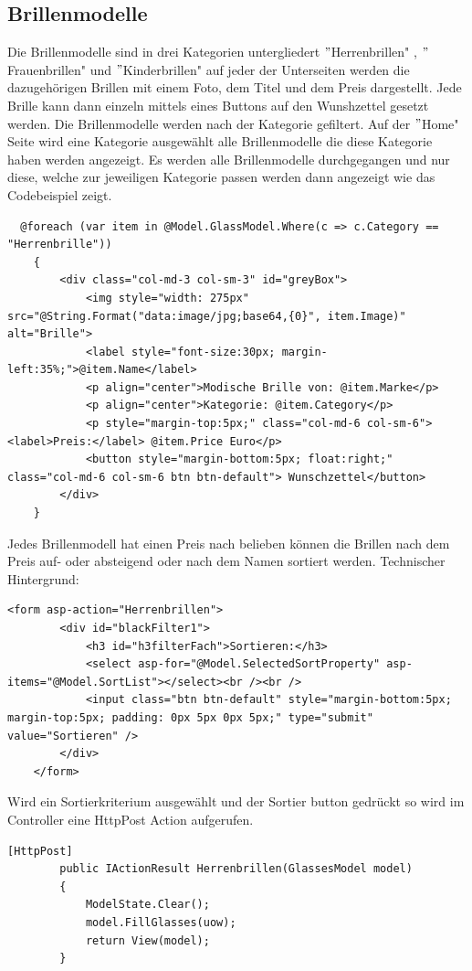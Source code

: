 \subsection{Brillenmodelle}
Die Brillenmodelle sind in drei Kategorien untergliedert $"$Herrenbrillen" , $"$Frauenbrillen" und $"$Kinderbrillen" auf jeder der Unterseiten werden die dazugehörigen Brillen mit einem Foto, dem Titel und dem Preis dargestellt. Jede Brille kann dann einzeln mittels eines Buttons auf den Wunshzettel gesetzt werden.
Die Brillenmodelle werden nach der Kategorie gefiltert. Auf der $"$Home" Seite wird eine Kategorie ausgewählt alle Brillenmodelle die diese Kategorie haben werden angezeigt.
Es werden alle Brillenmodelle durchgegangen und nur diese, welche zur jeweiligen Kategorie passen werden dann angezeigt wie das Codebeispiel zeigt.
\begin{lstlisting}
  @foreach (var item in @Model.GlassModel.Where(c => c.Category == "Herrenbrille"))
    {
        <div class="col-md-3 col-sm-3" id="greyBox">
            <img style="width: 275px" src="@String.Format("data:image/jpg;base64,{0}", item.Image)" alt="Brille">
            <label style="font-size:30px; margin-left:35%;">@item.Name</label>
            <p align="center">Modische Brille von: @item.Marke</p>
            <p align="center">Kategorie: @item.Category</p>
            <p style="margin-top:5px;" class="col-md-6 col-sm-6"><label>Preis:</label> @item.Price Euro</p>
            <button style="margin-bottom:5px; float:right;" class="col-md-6 col-sm-6 btn btn-default"> Wunschzettel</button>
        </div>
    }
\end{lstlisting}
Jedes Brillenmodell hat einen Preis nach belieben können die Brillen nach dem Preis auf- oder absteigend oder nach dem Namen sortiert werden.
Technischer Hintergrund:
\begin{lstlisting} 
<form asp-action="Herrenbrillen">
        <div id="blackFilter1">
            <h3 id="h3filterFach">Sortieren:</h3>
            <select asp-for="@Model.SelectedSortProperty" asp-items="@Model.SortList"></select><br /><br />
            <input class="btn btn-default" style="margin-bottom:5px; margin-top:5px; padding: 0px 5px 0px 5px;" type="submit" value="Sortieren" />
        </div>
    </form>
\end{lstlisting}
Wird ein Sortierkriterium ausgewählt und der Sortier button gedrückt so wird im Controller eine HttpPost Action aufgerufen.
\begin{lstlisting}
[HttpPost]
        public IActionResult Herrenbrillen(GlassesModel model)
        {
            ModelState.Clear();
            model.FillGlasses(uow);
            return View(model);
        }
\end{lstlisting}
